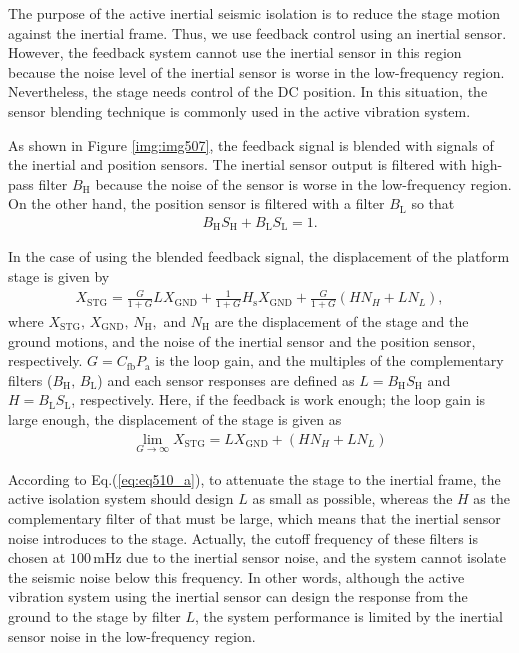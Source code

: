 The purpose of the active inertial seismic isolation is to reduce the stage motion against the inertial frame. Thus, we use feedback control using an inertial sensor. However, the feedback system cannot use the inertial sensor in this region because the noise level of the inertial sensor is worse in the low-frequency region. Nevertheless, the stage needs control of the DC position. In this situation, the sensor blending technique is commonly used in the active vibration system.

As shown in Figure \ref{img:img507}, the feedback signal is blended with signals of the inertial and position sensors. The inertial sensor output is filtered with high-pass filter $B_{\mathrm{H}}$ because the noise of the sensor is worse in the low-frequency region. On the other hand, the position sensor is filtered with a filter $B_{\mathrm{L}}$ so that
\begin{eqnarray}
  B_{\mathrm{H}}S_{\mathrm{H}} + B_{\mathrm{L}}S_{\mathrm{L}} = 1.   \label{eq:eq506}
\end{eqnarray}


In the case of using the blended feedback signal, the displacement of the platform stage is given by
\begin{eqnarray}
  X_{\mathrm{STG}} = \frac{G}{1+G}LX_{\mathrm{GND}} + \frac{1}{1+G}H_{\mathrm{s}}X_{\mathrm{GND}} + \frac{G}{1+G}\left(HN_{H}+LN_{L}\right),   \label{eq:eq510}
\end{eqnarray}
where $X_{\mathrm{STG}},\,X_{\mathrm{GND}},\,N_{\mathrm{H}},$ and $N_{\mathrm{H}}$ are the displacement of the stage and the ground motions, and the noise of the inertial sensor and the position sensor, respectively. $G=C_{\mathrm{fb}}P_{\mathrm{a}}$ is the loop gain, and the multiples of the complementary filters ($B_{\mathrm{H}},\,B_{\mathrm{L}}$) and each sensor responses are defined as $L=B_{\mathrm{H}}S_{\mathrm{H}}$ and $H=B_{\mathrm{L}}S_{\mathrm{L}}$, respectively. Here, if the feedback is work enough; the loop gain is large enough, the displacement of the stage is given as
\begin{eqnarray}
  \lim_{G\to\infty} X_{\mathrm{STG}} = LX_{\mathrm{GND}} + \left(HN_{H}+LN_{L}\right) \label{eq:eq510_a}
\end{eqnarray}

According to Eq.(\ref{eq:eq510_a}), to attenuate the stage to the inertial frame, the active isolation system should design $L$ as small as possible, whereas the $H$ as the complementary filter of that must be large, which means that the inertial sensor noise introduces to the stage. Actually, the cutoff frequency of these filters is chosen at $100\,\mathrm{mHz}$ due to the inertial sensor noise, and the system cannot isolate the seismic noise below this frequency. In other words, although the active vibration system using the inertial sensor can design the response from the ground to the stage by filter $L$, the system performance is limited by the inertial sensor noise in the low-frequency region.

